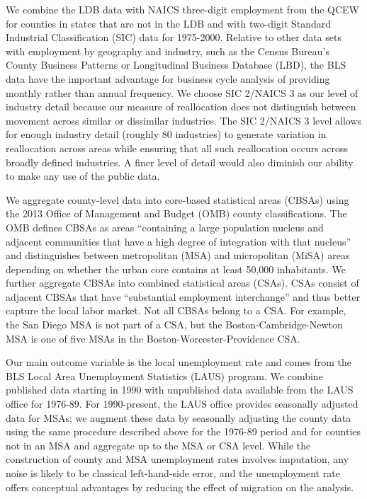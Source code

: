 \documentclass[12pt]{article}
\newcommand{\highlightPP}[1]{{\emph{\color{MyPurple}{#1}}}}
\theoremstyle{definition}
\begin{document}
We combine the LDB data with NAICS three-digit employment from the QCEW for counties in states that are not in the LDB and with two-digit Standard Industrial Classification (SIC) data for 1975-2000. \highlightPP{We seasonally adjust all series at the industry-county level using the multistep moving average approach contained in the Census Bureau's X-11 algorithm.} Relative to other data sets with employment by geography and industry, such as the Census Bureau's County Business Patterns or Longitudinal Business Database (LBD), the BLS data have the important advantage for business cycle analysis of providing monthly rather than annual frequency. We choose SIC 2/NAICS 3 as our level of industry detail because our measure of reallocation does not distinguish between movement across similar or dissimilar industries. The SIC 2/NAICS 3 level allows for enough industry detail (roughly 80 industries) to generate variation in reallocation across areas while ensuring that all such reallocation occurs across broadly defined industries. A finer level of detail would also diminish our ability to make any use of the public data.

We aggregate county-level data into core-based statistical areas (CBSAs) using the 2013 Office of Management and Budget (OMB) county classifications. The OMB defines CBSAs as areas ``containing a large population nucleus and adjacent communities that have a high degree of integration with that nucleus'' and distinguishes between metropolitan (MSA) and micropolitan (MiSA) areas depending on whether the urban core contains at least 50,000 inhabitants. We further aggregate CBSAs into combined statistical areas (CSAs). CSAs consist of adjacent CBSAs that have ``substantial employment interchange'' and thus better capture the local labor market. Not all CBSAs belong to a CSA. For example, the San Diego MSA is not part of a CSA, but the Boston-Cambridge-Newton MSA is one of five MSAs in the Boston-Worcester-Providence CSA.


Our main outcome variable is the local unemployment rate and comes from the BLS Local Area Unemployment Statistics (LAUS) program. We combine published data starting in 1990 with unpublished data available from the LAUS office for 1976-89. For 1990-present, the LAUS office provides seasonally adjusted data for MSAs; we augment these data by seasonally adjusting the county data using the same procedure described above for the 1976-89 period and for counties not in an MSA and aggregate up to the MSA or CSA level. While the construction of county and MSA unemployment rates involves imputation, any noise is likely to be classical left-hand-side error, and the unemployment rate offers conceptual advantages by reducing the effect of migration on the analysis.
\end{document}
